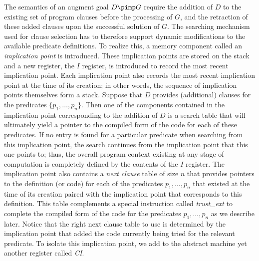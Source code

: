 The semantics of an augment goal $D\pimp G$ require the addition of $D$
to the existing set of program clauses before the processing of $G$,
and the retraction of these added clauses upon the successful
solution of $G$.
The searching mechanism used for clause selection has to therefore
support dynamic modifications to the available predicate definitions.
To realize this, a memory component called an {\it implication point}
is introduced. These implication points are stored on the stack and a
new register, the $I$ register, is introduced to record the most
recent implication point. Each implication point also records the most
recent implication point at the time of its creation; in other words,
the sequence of implication points themselves form a stack. Suppose
that $D$ provides (additional) clauses for the predicates
$\{p_1,\ldots,p_n\}$. Then one of the components contained in the
implication point corresponding to the addition of $D$ is a search
table that will ultimately yield a pointer to the compiled form of the
code for each of these predicates. If no entry is found for a
particular predicate when searching from this implication point, the
search continues from the implication point that this one points to;
thus, the overall program context existing at any stage of computation
is completely defined by the contents of the $I$ register.  The
implication point also contains a {\em next clause} table of size $n$
that provides pointers to the definition (or code) for each of the
predicates $p_1,\ldots,p_n$ that existed at the time of its creation
paired with the implication point that corresponds to this
definition. This table complements a special instruction called {\it
  trust\_ext} to complete the compiled form of the code for the
predicates $p_1,\ldots,p_n$ as we describe later. Notice that the
right next clause table to use is determined by the implication point
that added the code currently being tried for the relevant
predicate. To isolate this implication point, we add to the abstract
machine yet another register called {\it CI}.

